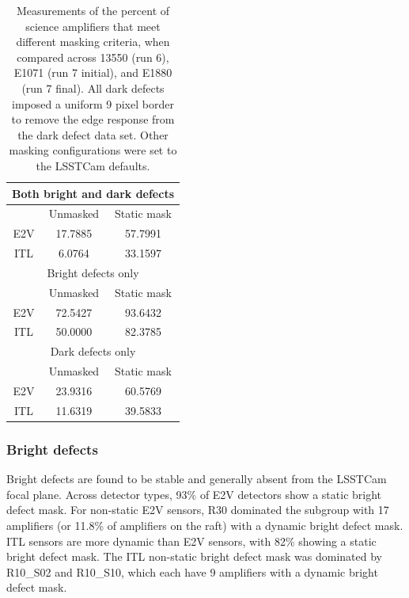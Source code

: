 \begin{table}[H]\label{table:defectStability:measurements}
\centering
\begin{tabular}{|ccc|}
\hline
\multicolumn{3}{|c|}{Both bright and dark defects}                      \\ \hline
\multicolumn{1}{|c|}{}    & \multicolumn{1}{c|}{Unmasked} & Static mask \\ \hline
\multicolumn{1}{|c|}{E2V} & \multicolumn{1}{c|}{17.7885}  & 57.7991     \\ \hline
\multicolumn{1}{|c|}{ITL} & \multicolumn{1}{c|}{6.0764}   & 33.1597     \\ \hline
\multicolumn{3}{|c|}{Bright defects only}                               \\ \hline
\multicolumn{1}{|c|}{}    & \multicolumn{1}{c|}{Unmasked} & Static mask \\ \hline
\multicolumn{1}{|c|}{E2V} & \multicolumn{1}{c|}{72.5427}  & 93.6432     \\ \hline
\multicolumn{1}{|c|}{ITL} & \multicolumn{1}{c|}{50.0000}  & 82.3785     \\ \hline
\multicolumn{3}{|c|}{Dark defects only}                                 \\ \hline
\multicolumn{1}{|c|}{}    & \multicolumn{1}{c|}{Unmasked} & Static mask \\ \hline
\multicolumn{1}{|c|}{E2V} & \multicolumn{1}{c|}{23.9316}  & 60.5769     \\ \hline
\multicolumn{1}{|c|}{ITL} & \multicolumn{1}{c|}{11.6319}  & 39.5833     \\ \hline
\end{tabular}
\caption{Measurements of the percent of science amplifiers that meet different masking criteria, when compared across 13550 (run 6), E1071 (run 7 initial), and E1880 (run 7 final). All dark defects imposed a uniform 9 pixel border to remove the edge response from the dark defect data set. Other masking configurations were set to the LSSTCam defaults.}
\end{table}

\subsubsection{Bright defects}

Bright defects are found to be stable and generally absent from the LSSTCam focal plane. Across detector types, 93\% of E2V detectors show a static bright defect mask. For non-static E2V sensors, R30 dominated the subgroup with 17 amplifiers (or 11.8\% of amplifiers on the raft) with a dynamic bright defect mask. ITL sensors are more dynamic than E2V sensors, with 82\% showing a static bright defect mask. The ITL non-static bright defect mask was dominated by R10\_S02 and R10\_S10, which each have 9 amplifiers with a dynamic bright defect mask.

